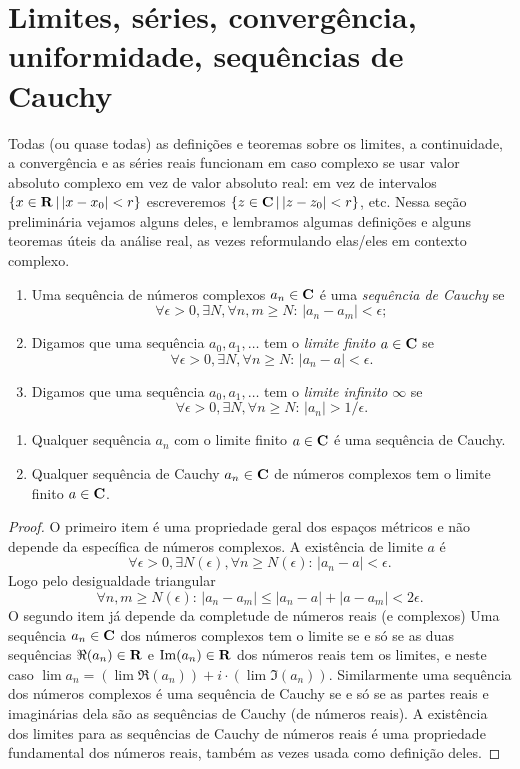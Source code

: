 \section{Limites, séries, convergência, uniformidade, sequências de Cauchy}

Todas (ou quase todas) as definições e teoremas sobre os limites, a continuidade,
a convergência e as séries reais funcionam em caso complexo
se usar valor absoluto complexo em vez de valor absoluto real:
em vez de intervalos $\{x\in \mathbf{R}\,|\,|x-x_0|<r\}$ escreveremos $\{z\in \mathbf{C}\,|\,|z-z_0|<r\}$, etc.
Nessa seção preliminária vejamos alguns deles, e lembramos algumas definições
e alguns teoremas úteis da análise real, as vezes reformulando elas/eles em contexto complexo.

\begin{defin}
\begin{enumerate}
\item Uma sequência de números complexos $a_n\in\mathbf{C}$ é uma \emph{sequência de Cauchy} se
\[ \forall \epsilon>0, \exists N, \forall n,m\geq N:\, |a_n-a_m| <\epsilon; \]
\item Digamos que uma sequência $a_0,a_1,\dots$ tem o \emph{limite finito} $a\in\mathbf{C}$ se
\[ \forall \epsilon> 0, \exists N, \forall n\geq N: \, |a_n-a| < \epsilon. \]
\item Digamos que uma sequência $a_0,a_1,\dots$ tem o \emph{limite infinito} $\infty$ se
\[ \forall \epsilon> 0, \exists N, \forall n\geq N: \, |a_n| > 1/\epsilon. \]
\end{enumerate}
\end{defin}

\begin{prop}
\label{cauchy-limite}
\begin{enumerate}
\item Qualquer sequência $a_n$ com o limite finito $a\in\mathbf{C}$ é uma sequência de Cauchy.
\item Qualquer sequência de Cauchy $a_n\in\mathbf{C}$ de números complexos tem o limite finito $a\in \mathbf{C}$.
\end{enumerate}
\end{prop}
\begin{proof}
O primeiro item é uma propriedade geral dos espaços métricos e não depende da específica de números complexos.
A existência de limite $a$ é
\[ \forall \epsilon>0, \exists N(\epsilon), \forall n\geq N(\epsilon): \, |a_n-a| <\epsilon . \]
Logo pelo desigualdade triangular
\[ \forall n,m\geq N(\epsilon): \, |a_n-a_m| \leq |a_n-a| + |a-a_m| < 2\epsilon . \]
O segundo item já depende da completude de números reais (e complexos)
Uma sequência $a_n \in \mathbf{C}$ dos números complexos
tem o limite se e só se as duas sequências $\Re(a_n)\in \mathbf{R}$ e $\operatorname{Im}(a_n)\in\mathbf{R}$
dos números reais tem os limites, e neste caso $\lim a_n = (\lim \Re(a_n)) + i \cdot (\lim \Im(a_n))$.
Similarmente uma sequência dos números complexos é uma sequência de Cauchy
se e só se as partes reais e imaginárias dela são as sequências de Cauchy (de números reais). 
A existência dos limites para as sequências de Cauchy de números reais
é uma propriedade fundamental dos números reais, também as vezes usada como definição deles.
\end{proof}

